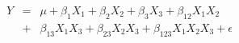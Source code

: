 \documentclass[12pt]{article}
\begin{document}
\pagestyle{empty}
\Large
{}
\pagecolor{ehandbook}

\boldmath
\begin{eqnarray*}
Y &=& \mu + \beta_1 X_1 + \beta_2 X_2 + \beta_3 X_3 + \beta_{12} X_1 X_2 \\
        &+& \beta_{13} X_1 X_3 + \beta_{23} X_2 X_3 + \beta_{123} X_1 X_2 X_3 + \epsilon
\end{eqnarray*}
\end{document}

